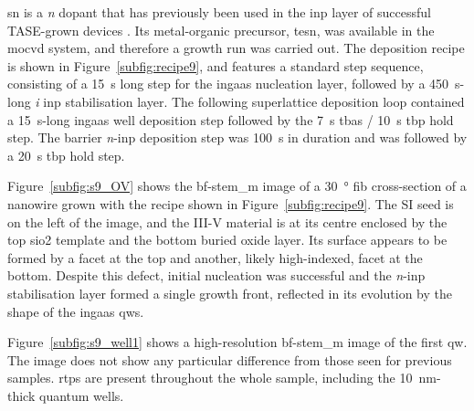 \Acl{sn} is a \textit{n} dopant \cite{Vedel2023} that has previously been used in the \acs{inp} layer of successful \acs{TASE}-grown devices \cite{Wen2022}. Its metal-organic precursor, \acf{tesn}, was available in the \acs{mocvd} system, and therefore a growth run was carried out. The deposition recipe is shown in Figure~\ref{subfig:recipe9}, and features a standard step sequence, consisting of a \qty{15}{\second} long step for the \acs{ingaas} nucleation layer, followed by a \qty{450}{\second}-long \textit{i} \acs{inp} stabilisation layer. The following superlattice deposition loop contained a \qty{15}{\second}-long \acs{ingaas} well deposition step followed by the \qty{7}{\second} \acs{tbas} / \qty{10}{\second} \acs{tbp} hold step. The barrier \textit{n}-\acs{inp} deposition step was \qty{100}{\second} in duration and was followed by a \qty{20}{\second} \acs{tbp} hold step.

Figure~\ref{subfig:s9_OV} shows the \acs{bf}-\acs{stem_m} image of a \qty{30}{\degree} \acs{fib} cross-section of a nanowire grown with the recipe shown in Figure~\ref{subfig:recipe9}. The \acl{SI} seed is on the left of the image, and the III-V material is at its centre enclosed by the top \acs{sio2} template and the bottom buried oxide layer. Its surface appears to be formed by a  facet at the top and another, likely high-indexed, facet at the bottom. Despite this defect, initial nucleation was successful and the \textit{n}-\acs{inp} stabilisation layer formed a single  growth front, reflected in its evolution by the shape of the \acs{ingaas} \acl{qw}s.

Figure~\ref{subfig:s9_well1} shows a high-resolution \acs{bf}-\acs{stem_m} image of the first \acl{qw}. The image does not show any particular difference from those seen for previous samples. \Acl{rtp}s are present throughout the whole sample, including the \qty{10}{\nano\metre}-thick quantum wells.

